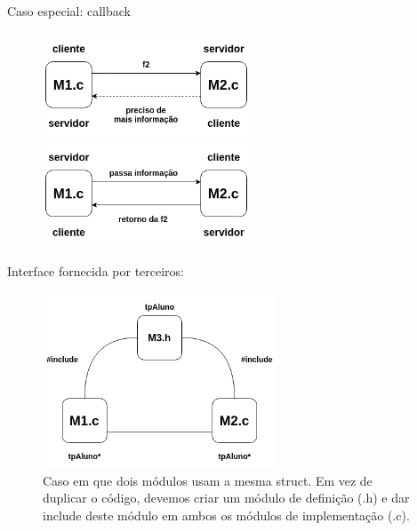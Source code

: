 \documentclass[
	12pt, %
]{fphw}
\begin{document}
\begin{doublespace}
\begin{enumerate}
              Caso especial: callback

              \begin{figure}[h!]
                  \centering
                  \includegraphics[width=0.55\textwidth]{callback1.png}
                  \includegraphics[width=0.55\textwidth]{callback2.png}
              \end{figure}

              \pagebreak

              Interface fornecida por terceiros:

              \begin{figure}[h]
                  \centering
                  \includegraphics[width=0.62\textwidth]{interfacefornecida.png}
                  \caption*{Caso em que dois módulos usam a mesma struct. Em vez de duplicar o código, devemos criar um módulo de definição (.h) e dar include deste módulo em ambos os módulos de implementação (.c).}
              \end{figure}

    \end{enumerate}
\end{doublespace}
\end{document}
